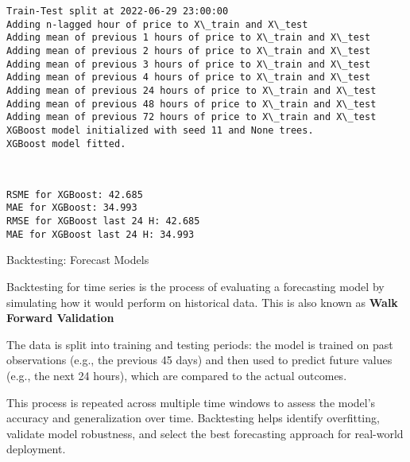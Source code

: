 \documentclass[11pt]{article}
\begin{document}
    \begin{Verbatim}[commandchars=\\\{\}]
Train-Test split at 2022-06-29 23:00:00
Adding n-lagged hour of price to X\_train and X\_test
Adding mean of previous 1 hours of price to X\_train and X\_test
Adding mean of previous 2 hours of price to X\_train and X\_test
Adding mean of previous 3 hours of price to X\_train and X\_test
Adding mean of previous 4 hours of price to X\_train and X\_test
Adding mean of previous 24 hours of price to X\_train and X\_test
Adding mean of previous 48 hours of price to X\_train and X\_test
Adding mean of previous 72 hours of price to X\_train and X\_test
XGBoost model initialized with seed 11 and None trees.
XGBoost model fitted.
    \end{Verbatim}

    \begin{center}
    \end{center}
    { \hspace*{\fill} \\}
    
    
    
    \begin{Verbatim}[commandchars=\\\{\}]
RSME for XGBoost: 42.685
MAE for XGBoost: 34.993
RMSE for XGBoost last 24 H: 42.685
MAE for XGBoost last 24 H: 34.993
    \end{Verbatim}

    Backtesting: Forecast Models

    Backtesting for time series is the process of evaluating a forecasting
model by simulating how it would perform on historical data. This is
also known as \textbf{Walk Forward Validation}

The data is split into training and testing periods: the model is
trained on past observations (e.g., the previous 45 days) and then used
to predict future values (e.g., the next 24 hours), which are compared
to the actual outcomes.

This process is repeated across multiple time windows to assess the
model's accuracy and generalization over time. Backtesting helps
identify overfitting, validate model robustness, and select the best
forecasting approach for real-world deployment.
\end{document}
